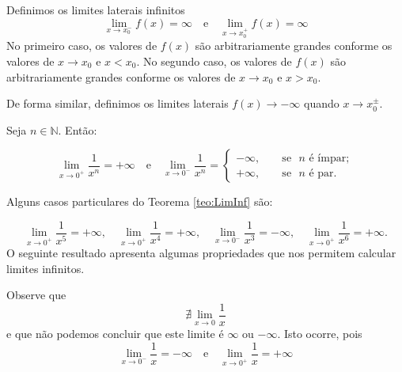 \cleardoublepage\documentclass[../main.tex]{subfiles}
\begin{document}
\begin{framed}
\begin{definition}
Definimos os limites laterais infinitos
\begin{equation*}
  \lim_{x\to x_0^-} f(x) = \infty\quad\text{e}\quad\lim_{x\to x_0^+} f(x) = \infty
\end{equation*}
No primeiro caso, os valores de $f(x)$ são arbitrariamente grandes conforme os valores de $x\to x_0$ e $x<x_0$. No segundo caso, os valores de $f(x)$ são arbitrariamente grandes conforme os valores de $x\to x_0$ e $x>x_0$.

De forma similar, definimos os limites laterais $f(x)\to -\infty$ quando $x\to x_0^{\pm}$.
\end{definition}
\end{framed}

\begin{framed}
\begin{teo}\label{teo:LimInf}
Seja \(n\in \mathbb{N}\). Então:

\[ \lim\limits_{x \to 0^{+}}\dfrac{1}{x^n}=+\infty \quad \mbox{e}\quad \lim\limits_{x \to 0^{-}}\dfrac{1}{x^n}= \left\{ \begin{array}{ccl} -\infty,& & \mbox{ se }\,\, n\,\, \mbox{é ímpar};\\ +\infty,& & \mbox{ se }\,\, n\,\, \mbox{é par}. \end{array}\right. \]
\end{teo}
\end{framed}

\begin{ex}
  Alguns casos particulares do Teorema \ref{teo:LimInf} são:

\[ \lim\limits_{x \to 0^{+}}\dfrac{1}{x^5}=+\infty, \quad\lim\limits_{x \to 0^{+}}\dfrac{1}{x^4}=+\infty, \quad \lim\limits_{x \to 0^{-}}\dfrac{1}{x^3}=-\infty, \quad \lim\limits_{x \to 0^{+}}\dfrac{1}{x^6}=+\infty. \]
O seguinte resultado apresenta algumas propriedades que nos permitem calcular limites infinitos.
\end{ex}

\begin{ex}
  Observe que
  \begin{equation*}
    \nexists \lim_{x\to 0} \frac{1}{x}
  \end{equation*}
  e que não podemos concluir que este limite é $\infty$ ou $-\infty$. Isto ocorre, pois
  \begin{equation*}
    \lim_{x\to 0^-} \frac{1}{x} = -\infty\quad\text{e}\quad\lim_{x\to 0^+} \frac{1}{x} = +\infty
  \end{equation*}
\end{ex}
\end{document}
